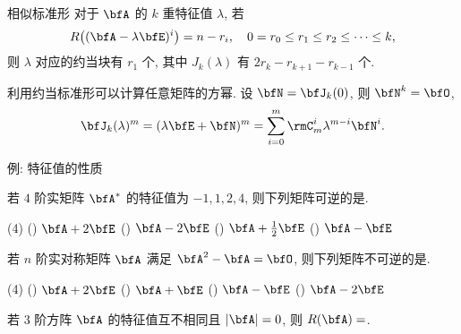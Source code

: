 \begin{frame}{相似标准形\noexer}
	\onslide<+->
	对于 $\bfA$ 的 $k$ 重特征值 $\lambda$,
	\onslide<+->
	若
	\[R\bigl((\bfA-\lambda\bfE)^i\bigr)=n-r_i,\quad
	0=r_0\le r_1\le r_2\le \cdots\le k,\]
	\onslide<+->
	则 $\lambda$ 对应的约当块有 $r_1$ 个, 其中 $J_k(\lambda)$ 有 $2r_k-r_{k+1}-r_{k-1}$ 个.
	
	\onslide<+->
	利用约当标准形可以计算任意矩阵的方幂.
	\onslide<+->
	设 $\bfN=\bfJ_k(0)$, 则 $\bfN^k=\bfO$,
	\[\bfJ_k(\lambda)^m
	=(\lambda\bfE+\bfN)^m=\sum_{i=0}^m \rmC_m^i \lambda^{m-i}\bfN^i.\]
\end{frame}


\begin{frame}{例: 特征值的性质}
	\onslide<+->
	\begin{exercise}
		若 $4$ 阶实矩阵 $\bfA^*$ 的特征值为 $-1,1,2,4$, 则下列矩阵可逆的是.
		
		\begin{taskschoice}(4)
			() $\bfA+2\bfE$
			() $\bfA-2\bfE$
			() $\bfA+\frac12\bfE$
			() $\bfA-\bfE$
		\end{taskschoice}
	\end{exercise}
	\onslide<+->
	\begin{exercise}
		若 $n$ 阶实对称矩阵 $\bfA$ 满足 $\bfA^2-\bfA=\bfO$, 则下列矩阵不可逆的是\fillbraceframe{C}.
		
		\begin{taskschoice}(4)
			() $\bfA+2\bfE$
			() $\bfA+\bfE$
			() $\bfA-\bfE$
			() $\bfA-2\bfE$
		\end{taskschoice}
	\end{exercise}
	\onslide<+->
	\begin{exercise}
		若 $3$ 阶方阵 $\bfA$ 的特征值互不相同且 $|\bfA|=0$, 则 $R(\bfA)=$\fillblankframe{$2$}.
	\end{exercise}
\end{frame}


